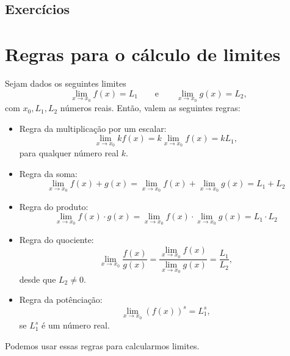 \subsection*{Exercícios}

\emconstrucao

\section{Regras para o cálculo de limites}\label{cap_lim_sec_regras}

Sejam dados os seguintes limites
\begin{equation}
  \lim_{x\to x_0} f(x) = L_1\qquad\text{e}\qquad \lim_{x\to x_0} g(x) = L_2,
\end{equation}
com $x_0, L_1, L_2$ números reais. Então, valem as seguintes regras:
\begin{itemize}
\item Regra da multiplicação por um escalar:
  \begin{equation}
    \lim_{x\to x_0} kf(x) = k\lim_{x\to x_0} f(x) = kL_1,
  \end{equation}
  para qualquer número real $k$.
\item Regra da soma:
  \begin{equation}
    \lim_{x\to x_0} f(x) + g(x) = \lim_{x\to x_0} f(x) + \lim_{x\to x_0} g(x) = L_1 + L_2
  \end{equation}
\item Regra do produto:
  \begin{equation}
    \lim_{x\to x_0} f(x) \cdot g(x) = \lim_{x\to x_0} f(x) \cdot \lim_{x\to x_0} g(x) = L_1 \cdot L_2
  \end{equation}
\item Regra do quociente:
  \begin{equation}
    \lim_{x\to x_0} \frac{f(x)}{g(x)} = \frac{\lim_{x\to x_0} f(x)}{\lim_{x\to x_0} g(x)} = \frac{L_1}{L_2},
  \end{equation}
  desde que $L_2\neq 0$.
\item Regra da potênciação:
  \begin{equation}
    \lim_{x\to x_0} (f(x))^s = L_1^s,
  \end{equation}
  se $L_1^s$ é um número real. 
\end{itemize}

Podemos usar essas regras para calcularmos limites.

